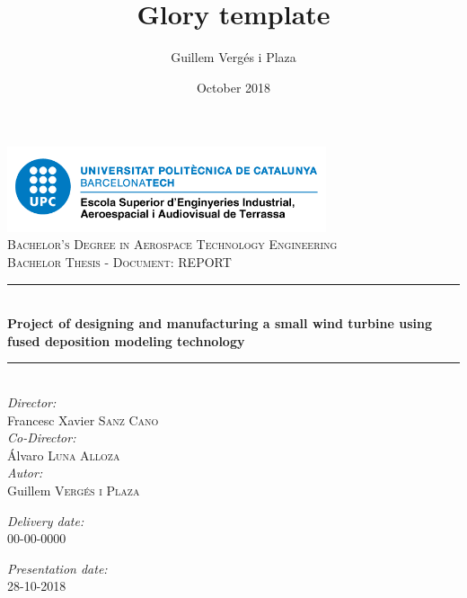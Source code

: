 \documentclass[11pt, a4paper, twoside]{book}
\title{Glory template}
\author{Guillem Vergés i Plaza }
\date{October 2018}
\newcommand\blankpage{%
	\null
	\thispagestyle{empty}%
	\addtocounter{page}{-1}%
	\newpage}
\begin{document}

\begin{titlepage}
\newcommand{\HRule}{\rule{\linewidth}{0.5mm}}
\center
\includegraphics[height=2.5cm]{Logo_escola.png}\\[2cm]

\textsc{\Large Bachelor's Degree in Aerospace Technology Engineering}\\[0.5cm]
\textsc{\large Bachelor Thesis - Document: REPORT}\\[0.5cm]
\HRule \\[0.4cm]
{\Large \bfseries Project of designing and manufacturing a small wind turbine using fused deposition modeling technology }\\[0.1cm]
\HRule \\[2cm]
\large \emph{Director:}\\[0.5cm] 
Francesc Xavier \textsc{Sanz Cano}\\
[1cm]
\large \emph{Co-Director:}\\[0.5cm] 
Álvaro \textsc{Luna Alloza}\\
[1.5cm]
\large \emph{Autor:}\\[0.5cm] 
Guillem \textsc{Vergés i Plaza}\\
[1cm]
\vfill


\afterpage{\blankpage}

\begin{minipage}{0.4\textwidth}
\begin{flushleft} \large
\emph{Delivery date:}\\[0.2cm] 00-00-0000
\end{flushleft}
\end{minipage}
\begin{minipage}{0.4\textwidth}
\begin{flushright} \large
\emph{Presentation date:}\\[0.2cm] 28-10-2018
\end{flushright}
\end{minipage}
\end{titlepage}
\end{document}
